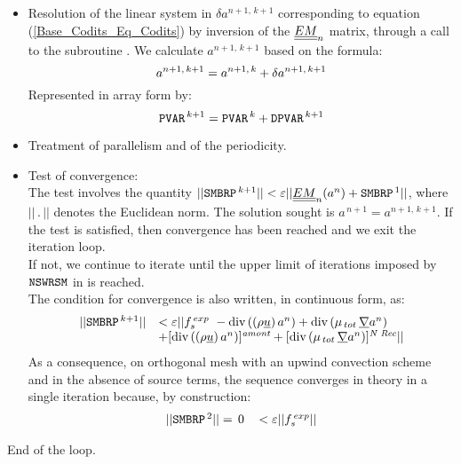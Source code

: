 \begin{itemize}
\item Resolution of the linear system in $\delta a^{n+1,\,k+1}$ corresponding
to equation (\ref{Base_Codits_Eq_Codits}) by inversion of the $\underline{\underline{EM}}_{n}$ matrix, through a call to the subroutine .
We calculate $a^{n+1,\,k+1}$ based on the formula:
\begin{equation}\notag
a^{n+1,\,k+1} =  a^{n+1,\,k} + \delta a^{n+1,\,k+1}
\end{equation}
Represented in array form by:
\begin{equation}\notag
\text{\texttt{PVAR}}^{\,k+1} =  \text{\texttt{PVAR}}^{\,k} + \text{\texttt{DPVAR}}^{\,k+1}
\end{equation}

\item Treatment of parallelism and of the periodicity.
\item Test of convergence:\\
The test involves the quantity  $||\text{\texttt{SMBRP}}^{\,k+1}|| < \varepsilon
||\underline{\underline{EM}}_{n}(a^{n}) + \text{\texttt{SMBRP}}^{\,1}|| $, where $||\,.\,||$ denotes the
Euclidean norm. The solution sought is  $a^{\,n+1} = a^{n+1,\,k+1}$. If the test is satisfied, then convergence has been reached and we exit the iteration loop. \\
If not, we continue to iterate until the upper limit of iterations imposed by $\text{\texttt{NSWRSM}}$ in  is reached.\\
The condition for convergence is also written, in continuous form, as:
\begin{equation}\notag
\begin{array}{ll}
||\text{\texttt{SMBRP}}^{\,k+1}||& < \varepsilon ||f_s^{\,exp}\ - \text{div}\,((\rho \underline{u})\,a^{n}) + \text{div}\,(\mu_{\,tot}\,\underline{\nabla} a^{n}) \\
& +[\text{div}\,((\rho \underline{u})\,a^{n})]^{\textit{amont}} + [\text{div}\,(\mu_{\,tot}\,\underline{\nabla} a^{n})]^{\textit{N Rec}}||\\
\end{array}
\end{equation}
As a consequence, on orthogonal mesh with an upwind convection scheme and in the absence of source terms, the sequence converges in theory in a single iteration because, by construction:
\begin{equation}\notag
\begin{array}{ll}
||\text{\texttt{SMBRP}}^{\,2}||=\,0\,& < \varepsilon ||f_s^{\,exp}||
\end{array}
\end{equation}
\end{itemize}
End of the loop.
\\

